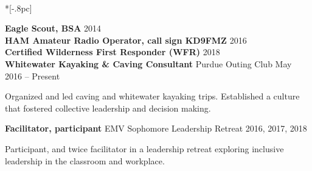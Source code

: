 \documentclass{article}
\begin{document}
\vspace{8pt}{\large \bf Leadership \& Certifications} \\*[-.8pc]
\underline{\hspace{6in}}

\vspace{3pt}
\textbf{Eagle Scout, BSA} \hfill 2014\\
\textbf{HAM Amateur Radio Operator, call sign KD9FMZ} \hfill 2016\\
\textbf{Certified Wilderness First Responder (WFR)} \hfill 2018\\

\vspace{-7pt}
\textbf{Whitewater Kayaking \& Caving Consultant} \hfill Purdue Outing Club \hfill May 2016 -- Present\\
\vspace{-12pt}
\begin{adjustwidth}{20pt}{}
Organized and led caving and whitewater kayaking trips. Established a culture that fostered collective leadership and decision making.\\
\end{adjustwidth}
\vspace{-9pt}
\textbf{Facilitator, participant} \hfill EMV Sophomore Leadership Retreat \hfill 2016, 2017, 2018\\
\vspace{-12pt}
\begin{adjustwidth}{20pt}{}
Participant, and twice facilitator in a leadership retreat exploring inclusive leadership in the classroom and workplace.
\end{adjustwidth}
\end{document}
